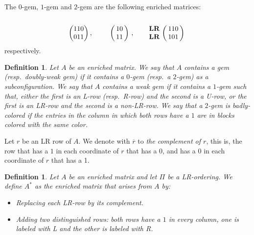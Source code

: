 \documentclass[12pt]{book}
\theoremstyle{plain}
\newtheorem{defn}[teo]{Definition}
\theoremstyle{remark}
\begin{document}
\vspace{2mm}
The $0$-gem, $1$-gem and $2$-gem are the following enriched matrices:
\[ 		\begin{pmatrix}
		 1 1 0 \cr
		0 1 1
		\end{pmatrix}, \qquad
		\bordermatrix{ & \cr
		 & 1 0 \cr
		 & 1 1 }\ , \qquad
		\bordermatrix{ & \cr
		\textbf{LR} & 1 1 0 \cr
		\textbf{LR} & 1 0 1  }\  \]
respectively.

\begin{defn}  \label{def:gems}
	Let $A$ be an enriched matrix. We say that $A$ \emph{contains a gem} (resp.\ \emph{doubly-weak gem}) if it contains a $0$-gem (resp.\ a $2$-gem) as a subconfiguration.
	We say that $A$ \emph{contains a weak gem} if it contains a $1$-gem such that, either the first is an L-row (resp.\ R-row) and the second is a U-row, or the first is an LR-row and the second is a non-LR-row.
	We say that a $2$-gem is \emph{badly-colored }if the entries in the column in which both rows have a $1$ are in blocks colored with the same color. %
\end{defn}


Let $r$ be an LR row of $A$. We denote with $\overline{r}$ to \emph{the complement of $r$}, this is, the row that has a $1$ in each coordinate of $r$ that has a 0, and has a $0$ in each coordinate of $r$ that has a 1.


\begin{defn} \label{def:A*}
	Let $A$ be an enriched matrix and let $\Pi$ be a LR-ordering. %
	We define $A^*$ as the enriched matrix that arises from $A$ by:
\begin{itemize}
	\item Replacing each LR-row by its complement.
	\item Adding two distinguished rows: both rows have a $1$ in every column, one is labeled with L and the other is labeled with R. %
\end{itemize}	 
\end{defn}
\end{document}

